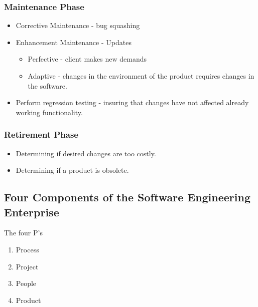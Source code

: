 \documentclass{report}
\begin{document}
		\subsubsection{Maintenance Phase}
			\begin{itemize}
				\item Corrective Maintenance - bug squashing
				\item Enhancement Maintenance - Updates
				\begin{itemize}
					\item Perfective - client makes new demands
					\item Adaptive - changes in the environment of the product requires changes in the software.
				\end{itemize}
				\item Perform regression testing - insuring that changes have not affected already working functionality.
			\end{itemize}
		\subsubsection{Retirement Phase}
			\begin{itemize}
				\item Determining if desired changes are too costly.
				\item Determining if a product is obsolete.
			\end{itemize}
	\subsection{Four Components of the Software Engineering Enterprise}
	The four P's
	\begin{enumerate}
		\item Process
		\item Project
		\item People
		\item Product
	\end{enumerate}
\end{document}
